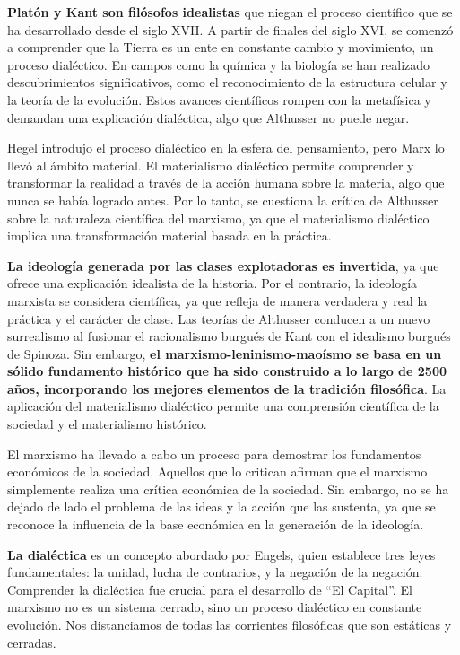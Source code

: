 \documentclass[
  letterpaper,
  DIV=11,
  numbers=noendperiod]{scrartcl}
\begin{document}
\textbf{Platón y Kant son filósofos idealistas} que niegan el proceso
científico que se ha desarrollado desde el siglo XVII. A partir de
finales del siglo XVI, se comenzó a comprender que la Tierra es un ente
en constante cambio y movimiento, un proceso dialéctico. En campos como
la química y la biología se han realizado descubrimientos
significativos, como el reconocimiento de la estructura celular y la
teoría de la evolución. Estos avances científicos rompen con la
metafísica y demandan una explicación dialéctica, algo que Althusser no
puede negar.

Hegel introdujo el proceso dialéctico en la esfera del pensamiento, pero
Marx lo llevó al ámbito material. El materialismo dialéctico permite
comprender y transformar la realidad a través de la acción humana sobre
la materia, algo que nunca se había logrado antes. Por lo tanto, se
cuestiona la crítica de Althusser sobre la naturaleza científica del
marxismo, ya que el materialismo dialéctico implica una transformación
material basada en la práctica.

\textbf{La ideología generada por las clases explotadoras es invertida},
ya que ofrece una explicación idealista de la historia. Por el
contrario, la ideología marxista se considera científica, ya que refleja
de manera verdadera y real la práctica y el carácter de clase. Las
teorías de Althusser conducen a un nuevo surrealismo al fusionar el
racionalismo burgués de Kant con el idealismo burgués de Spinoza. Sin
embargo, \textbf{el marxismo-leninismo-maoísmo se basa en un sólido
fundamento histórico que ha sido construido a lo largo de 2500 años,
incorporando los mejores elementos de la tradición filosófica}. La
aplicación del materialismo dialéctico permite una comprensión
científica de la sociedad y el materialismo histórico.

El marxismo ha llevado a cabo un proceso para demostrar los fundamentos
económicos de la sociedad. Aquellos que lo critican afirman que el
marxismo simplemente realiza una crítica económica de la sociedad. Sin
embargo, no se ha dejado de lado el problema de las ideas y la acción
que las sustenta, ya que se reconoce la influencia de la base económica
en la generación de la ideología.

\textbf{La dialéctica} es un concepto abordado por Engels, quien
establece tres leyes fundamentales: la unidad, lucha de contrarios, y la
negación de la negación. Comprender la dialéctica fue crucial para el
desarrollo de ``El Capital''. El marxismo no es un sistema cerrado, sino
un proceso dialéctico en constante evolución. Nos distanciamos de todas
las corrientes filosóficas que son estáticas y cerradas.
\end{document}
